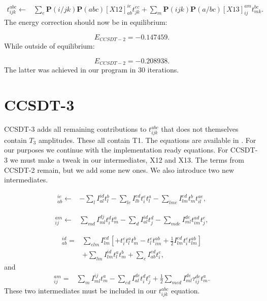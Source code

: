 \documentclass[a4paper,norsk,11pt,twoside]{report}
\begin{document}
\begin{align}
t_{ijk}^{abc} \leftarrow &
\sum_e \textbf{P}(i/jk) \textbf{P}(abc) [X12]_{ab}^{ie} t_{jk}^{ec}
+ \sum_m \textbf{P} (ijk) \textbf{P}(a/bc) [X13]_{ij}^{am} t_{mk}^{bc} .
\end{align}
The energy correction should now be in equilibrium:

\begin{equation}
E_{CCSDT-2} = -0.147459 .
\end{equation}
While outside of equilibrium:

\begin{equation}
E_{CCSDT-2} = -0.208938 .
\end{equation}
The latter was achieved in our program in 30 iterations.

\section{CCSDT-3}
CCSDT-3 adds all remaining contributions to $t_{ijk}^{abc}$ that does not themselves contain $T_3$ amplitudes. These  all contain T1. The equations are available in \cite{CCSDT-ref4}. For our purposes we continue with the implementation ready equations. For CCSDT-3 we must make a tweak in our intermediates, X12 and X13. The terms from CCSDT-2 remain, but we add some new ones. We also introduce two new intermediates.

\begin{align}
[X12]_{ab}^{ie} \leftarrow  & - \sum_l I_{al}^{id} t_l^b - \sum_{le} I_{lb}^{ed} t_i^e t_l^a - \sum_{lme} I_{lm}^{ed} t_m^b t_{il}^{ae} ,
\end{align}

\begin{align}
[X13]_{ij}^{am} \leftarrow & 
\sum_{md} I_{ml}^{dj} t_i^d t_m^a
- \sum_d I_{al}^{id} t_j^d
- \sum_{mde} I_{ml}^{de} t_{im}^{ad} t_j^e ,
\end{align}

\begin{align}
[X14]_{ab}^{id} = & 
\sum_{elm} I_{lm}^{ed} \left[
+ t_i^e t_l^a t_m^b
- t_l^e t_{im}^{ab} 
+ \frac{1}{2} I_{lm}^{ed} t_i^e t_{lm}^{ab}
\right]
\nonumber \\ &
+ \sum_{lm} I_{lm}^{id} t_l^a t_m^b
+ \sum_e I_{ab}^{ed} t_i^e ,
\end{align}
and
\begin{align}
[X15]_{ij}^{am} = &
\sum_m I_{ml}^{ij} t_m^a
- \sum_{ed} I_{al}^{de} t_i^d t_j^e
+ \frac{1}{2} \sum_{med} I_{ml}^{de} \tau_{ij}^{de} t_m^a  .
\end{align}
These two intermediates must be included in our $t_{ijk}^{abc}$ equation.
\end{document}
